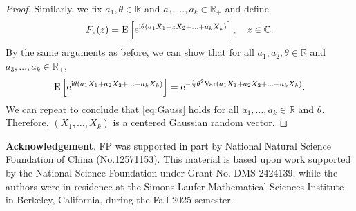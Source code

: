 \documentclass[12pt, reqno]{amsart}
\newcommand{\C}{{\mathbb{C}}}
\newcommand{\R}{{\mathbb{R}}}
\newcommand{\E}{\mathrm{E}}
\newcommand{\<}{\langle}
\renewcommand{\>}{\rangle}
\newcommand{\e}{\mathrm{e}}
\newcommand{\Var}{\text{\rm Var}}
\begin{document}
\begin{appendix}
\begin{proof}
          Similarly, we fix $a_1, \theta\in \R$ and $a_3, \ldots, a_k \in \R_+$ and define
          \begin{align*}
          F_2(z)=  \E\left[\e^{{\rm i}\theta (a_1X_1+zX_2+\ldots +a_kX_k)}\right],\quad z\in \C.
          \end{align*}
          By the same arguments as before, we can show that for all $a_1, a_2, \theta\in \R$ and $a_3, \ldots, a_k\in \R_+$, 
          \begin{align}\label{eq:Gauss}
          \E\left[\e^{{\rm i}\theta (a_1X_1+a_2X_2+\ldots +a_kX_k)}\right] = \e^{-\frac12\theta^2\Var(a_1X_1+a_2X_2+\ldots+a_kX_k)}.
          \end{align}
          We can repeat to conclude that \eqref{eq:Gauss} holds for all $a_1, \ldots, a_k\in \R$ and $\theta$. Therefore, $(X_1, \ldots, X_k)$
          is a centered Gaussian random vector.         
\end{proof}

\end{appendix}


\noindent\textbf{Acknowledgement}.  
FP was supported in part by  National Natural Science Foundation of China (No.12571153).
This material is based upon work supported by the National Science
Foundation under Grant No. DMS-2424139, while the authors were in
residence at the Simons Laufer Mathematical Sciences Institute in
Berkeley, California, during the Fall 2025 semester.
\end{document}
